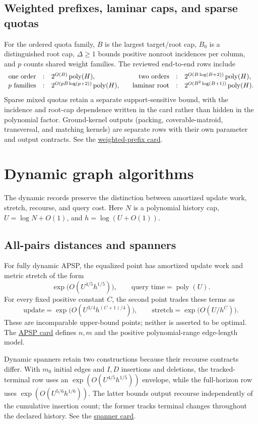 \documentclass[10pt,a4paper]{article}
\newcommand{\repo}[2]{\href{https://github.com/icekylinx/algorithm-frontier/#1}{#2}}
\newcommand{\poly}{\operatorname{poly}}
\theoremstyle{recordstyle}
\begin{document}
\subsection{Weighted prefixes, laminar caps, and sparse quotas}
For the ordered quota family, $B$ is the largest target/root cap, $B_0$ is a
distinguished root cap, $\Delta\geq 1$ bounds positive nonroot incidences per
column, and $p$ counts shared weight families.  The reviewed end-to-end rows
include
\[
\begin{array}{rcl@{\qquad}rcl}
\text{one order} &:& 2^{O(B)}\poly(H),
&\text{two orders} &:& 2^{O(B\log(B+2))}\poly(H),\\
\text{$p$ families} &:& 2^{O(pB\log(p+2))}\poly(H),
&\text{laminar root} &:& 2^{O(B^2\log(B+1))}\poly(H).
\end{array}
\]
Sparse mixed quotas retain a separate support-sensitive bound, with the
incidence and root-cap dependence written in the card rather than hidden in
the polynomial factor.  Ground-kernel outputs (packing, coverable-matroid,
transversal, and matching kernels) are separate rows with their own parameter
and output contracts.  See the
\repo{problems/weighted-prefix-quota-frontier/}{weighted-prefix card}.

\section{Dynamic graph algorithms}
The dynamic records preserve the distinction between amortized update work,
stretch, recourse, and query cost.  Here $N$ is a polynomial history cap,
$U=\log N+O(1)$, and $h=\log(U+O(1))$.

\subsection{All-pairs distances and spanners}
For fully dynamic APSP, the equalized point has amortized update work and metric
stretch of the form
\[
  \exp\!\bigl(O(U^{4/5}h^{1/5})\bigr),
  \qquad \text{query time}=\poly(U).
\]
For every fixed positive constant $C$, the second point trades these terms as
\[
  \text{update}=\exp\!\bigl(O(U^{3/4}h^{(C+1)/4})\bigr),
  \qquad
  \text{stretch}=\exp\!\bigl(O(U/h^C)\bigr).
\]
These are incomparable upper-bound points; neither is asserted to be optimal.
The \repo{problems/apsp-frontier/}{APSP card} defines $n,m$ and the positive
polynomial-range edge-length model.

Dynamic spanners retain two constructions because their recourse contracts
differ.  With $m_0$ initial edges and $I,D$ insertions and deletions, the
tracked-terminal row uses an $\exp(O(U^{4/5}h^{1/5}))$ envelope, while the
full-horizon row uses $\exp(O(U^{5/6}h^{1/6}))$.  The latter bounds output
recourse independently of the cumulative insertion count; the former tracks
terminal changes throughout the declared history.  See the
\repo{problems/dynamic-spanners/}{spanner card}.
\end{document}

